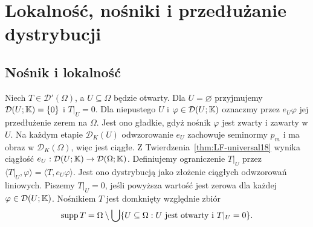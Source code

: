 \section{Lokalność, nośniki i przedłużanie dystrybucji}
\providecommand{\atlasref}[2]{#2}

\subsection{Nośnik i lokalność}

\begin{definicja}
\label{def:distribution-zero19}
Niech $T\in\mathcal D'(\Omega)$, a $U\subseteq\Omega$
będzie otwarty. Dla $U=\varnothing$ przyjmujemy
$\mathcal D(U;\mathbb K)=\{0\}$ i $T|_U=0$.
Dla niepustego $U$ i $\varphi\in\mathcal D(U;\mathbb K)$ oznaczmy przez
$e_U\varphi$ jej przedłużenie zerem na $\Omega$.
Jest ono gładkie, gdyż nośnik $\varphi$ jest zwarty
i zawarty w $U$. Na każdym etapie $\mathcal D_K(U)$
odwzorowanie $e_U$ zachowuje seminormy $p_m$ i ma obraz
w $\mathcal D_K(\Omega)$, więc jest ciągłe.
Z Twierdzenia~\ref{thm:LF-universal18} wynika ciągłość
$e_U:\mathcal D(U;\mathbb K)\to\mathcal D(\Omega;\mathbb K)$.
Definiujemy ograniczenie $T|_U$ przez
$\langle T|_U,\varphi\rangle=\langle T,e_U\varphi\rangle$.
Jest ono dystrybucją jako złożenie ciągłych odwzorowań liniowych.
Piszemy $T|_U=0$, jeśli powyższa wartość jest zerowa
dla każdej $\varphi\in\mathcal D(U;\mathbb K)$.
Nośnikiem $T$ jest domknięty względnie zbiór
\[\operatorname{supp} T=\Omega\setminus\bigcup\{U\subseteq\Omega:
U\text{ jest otwarty i }T|_U=0\}.\]
\end{definicja}

